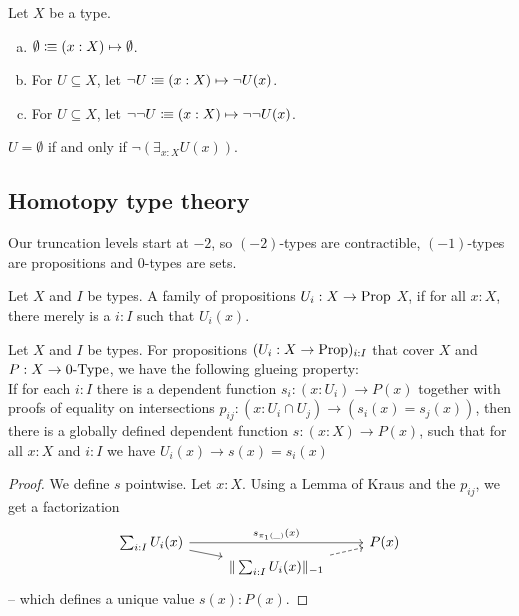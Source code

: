 \begin{definition}
  Let $X$ be a type.
  \begin{enumerate}[(a)]
  \item $\emptyset\vcentcolon\mspace{-1.2mu}\equiv (x:X)\mapsto \emptyset$. \index{$\emptyset$}
  \item For $U\subseteq X$, let $\neg U\vcentcolon\mspace{-1.2mu}\equiv (x:X)\mapsto \neg U(x)$. 
  \item For $U\subseteq X$, let $\neg\neg U\vcentcolon\mspace{-1.2mu}\equiv (x:X)\mapsto \neg\neg U(x)$. 
  \end{enumerate}
\end{definition}

\begin{lemma}
  $U=\emptyset$ if and only if $\neg\left(\exists_{x:X}U(x)\right)$.
\end{lemma}

\subsection{Homotopy type theory}

Our truncation levels start at $-2$, so $(-2)$-types are contractible, $(-1)$-types are propositions and $0$-types are sets.

\begin{definition}%
  Let $X$ and $I$ be types.
  A family of propositions $U_i:X\to\mathrm{Prop}$  $X$,
  if for all $x:X$, there merely is a $i:I$ such that $U_i(x)$.
\end{definition}

\begin{lemma}%
  \label{kraus-glueing}
  Let $X$ and $I$ be types.
  For propositions $(U_i:X \to \mathrm{Prop})_{i:I}$ that cover $X$ and $P:X\to 0\mbox{-}\mathrm{Type}$, we have the following glueing property: \\
  If for each $i:I$ there is a dependent function $s_i:(x:U_i)\to P(x)$ together with
  proofs of equality on intersections $p_{ij}:(x:U_i\cap U_j)\to (s_i(x)=s_j(x))$,
  then there is a globally defined dependent function $s:(x:X) \to P(x)$,
  such that for all $x:X$ and $i:I$ we have $U_i(x) \to s(x)=s_i(x)$
\end{lemma}

\begin{proof}
  We define $s$ pointwise.
  Let $x:X$.
  Using a Lemma of Kraus and the $p_{ij}$, we get a factorization
  \[ \begin{tikzcd}[row sep=0mm]
    \sum_{i:I} U_i(x) \ar[rr, "s_{\pi_1(\_)}(x)"]\ar[rd] & & P(x) \\
    & \|\sum_{i:I} U_i(x)\|_{-1}\ar[ru,dashed] &
  \end{tikzcd} \]
-- which defines a unique value $s(x):P(x)$.
\end{proof}

